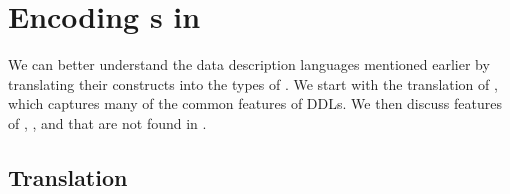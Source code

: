 \section{Encoding \ddl{}s in \ddc{}}
\label{sec:encodings}

We can better understand the data description languages mentioned
earlier by translating their constructs into the types of \ddc{}. We
start with the translation of \ipads{}, which captures many of the
common features of DDLs. We then discuss features of \pads{},
\datascript{}, and \packettypes{} that are not found in \ipads{}.
\subsection{\ipads{} Translation}
\label{sec:trans-sl}

